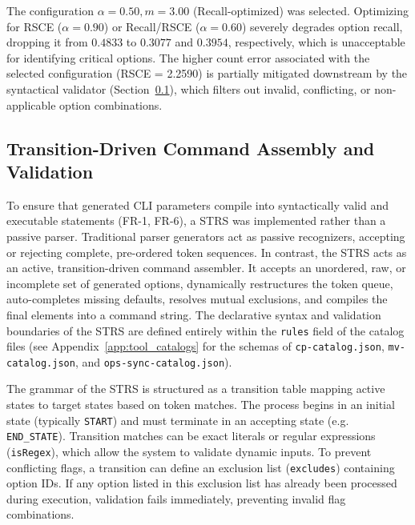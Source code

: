 The configuration $\alpha = 0.50, m = 3.00$ (Recall-optimized) was selected. Optimizing for RSCE ($\alpha = 0.90$) or Recall/RSCE ($\alpha = 0.60$) severely degrades option recall, dropping it from $0.4833$ to $0.3077$ and $0.3954$, respectively, which is unacceptable for identifying critical options. The higher count error associated with the selected configuration (\ac{RSCE} = 2.2590) is partially mitigated downstream by the syntactical validator (Section~\ref{sec:impl_validator}), which filters out invalid, conflicting, or non-applicable option combinations.

\subsection{Transition-Driven Command Assembly and Validation}\label{sec:impl_validator}

To ensure that generated CLI parameters compile into syntactically valid and executable statements (FR-1, FR-6), a \ac{STRS} was implemented rather than a passive parser. Traditional parser generators act as passive recognizers, accepting or rejecting complete, pre-ordered token sequences. In contrast, the \ac{STRS} acts as an active, transition-driven command assembler. It accepts an unordered, raw, or incomplete set of generated options, dynamically restructures the token queue, auto-completes missing defaults, resolves mutual exclusions, and compiles the final elements into a command string. The declarative syntax and validation boundaries of the STRS are defined entirely within the \texttt{rules} field of the catalog files (see Appendix~\ref{app:tool_catalogs} for the schemas of \texttt{cp-catalog.json}, \texttt{mv-catalog.json}, and \texttt{ops-sync-catalog.json}). 

The grammar of the STRS is structured as a transition table mapping active states to target states based on token matches. The process begins in an initial state (typically \texttt{START}) and must terminate in an accepting state (e.g. \texttt{END\_STATE}). Transition matches can be exact literals or regular expressions (\texttt{isRegex}), which allow the system to validate dynamic inputs. To prevent conflicting flags, a transition can define an exclusion list (\texttt{excludes}) containing option IDs. If any option listed in this exclusion list has already been processed during execution, validation fails immediately, preventing invalid flag combinations.

